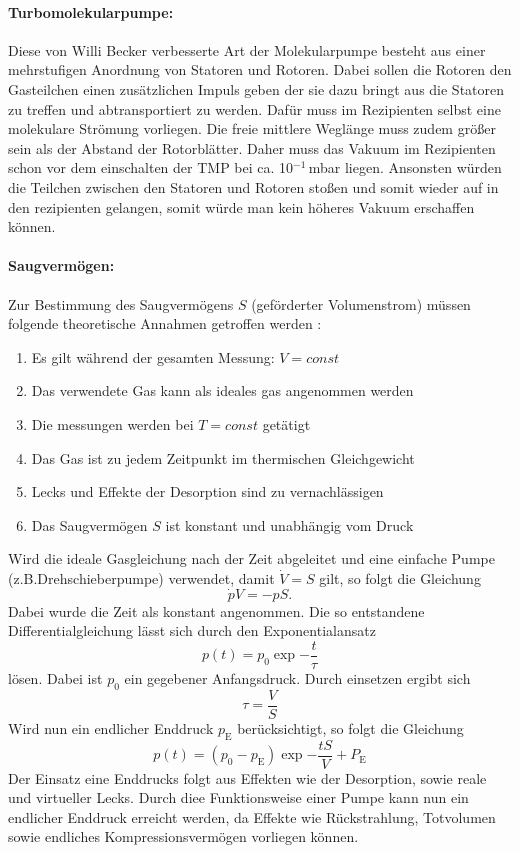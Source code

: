  \paragraph{Turbomolekularpumpe:}
 Diese von Willi Becker verbesserte Art der Molekularpumpe besteht aus einer mehrstufigen Anordnung von Statoren und Rotoren. Dabei sollen die
 Rotoren den Gasteilchen einen zusätzlichen Impuls geben der sie dazu bringt aus die Statoren zu treffen und abtransportiert zu werden. Dafür
 muss im Rezipienten selbst eine molekulare Strömung vorliegen. Die freie mittlere Weglänge muss zudem größer sein als der Abstand der Rotorblätter.
 Daher muss das Vakuum im Rezipienten schon vor dem einschalten der TMP bei ca. 10$^{-1}\,$mbar liegen. Ansonsten würden die Teilchen zwischen
 den Statoren und Rotoren stoßen und somit wieder auf in den rezipienten gelangen, somit würde man kein höheres Vakuum erschaffen können.

 \paragraph{Saugvermögen:}
 Zur Bestimmung des Saugvermögens $S$ (geförderter Volumenstrom) müssen folgende theoretische Annahmen getroffen werden \cite{anleitung}:
 \begin{enumerate}
   \item Es gilt während der gesamten Messung: $V = const$
   \item Das verwendete Gas kann als ideales gas angenommen werden
   \item Die messungen werden bei $T = const$ getätigt
   \item Das Gas ist zu jedem Zeitpunkt im thermischen Gleichgewicht
   \item Lecks und Effekte der Desorption sind zu vernachlässigen
   \item Das Saugvermögen $S$ ist konstant und unabhängig vom Druck
 \end{enumerate}
Wird die ideale Gasgleichung nach der Zeit abgeleitet und eine einfache Pumpe (z.B.Drehschieberpumpe) verwendet, damit $\dot{V} = S$ gilt,
so folgt die Gleichung
\begin{equation}
  \dot{p}V = -pS.
\end{equation}
Dabei wurde die Zeit als konstant angenommen.
Die so entstandene Differentialgleichung lässt sich durch den Exponentialansatz
\begin{equation}
  p(t) = p_0 \exp{-\frac{t}{\tau}}
\end{equation}
lösen. Dabei ist $p_0$ ein gegebener Anfangsdruck. Durch einsetzen ergibt sich
\begin{equation}
  \tau = \frac{V}{S}
\end{equation}
Wird nun ein endlicher Enddruck $p_\text{E}$ berücksichtigt, so folgt die Gleichung
\begin{equation}
  p(t) = (p_0 - p_\text{E})\exp{-\frac{tS}{V}}+P_\text{E}
\end{equation}
Der Einsatz eine Enddrucks folgt aus Effekten wie der Desorption, sowie reale und virtueller Lecks. Durch diee Funktionsweise einer Pumpe kann nun ein
endlicher Enddruck erreicht werden, da Effekte wie Rückstrahlung, Totvolumen sowie endliches Kompressionsvermögen vorliegen können.

